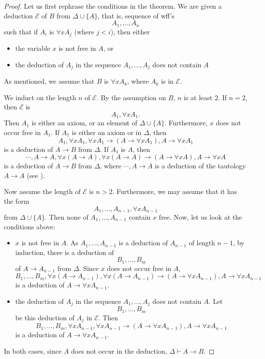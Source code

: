 \documentclass[12pt]{article}
\begin{document}
\begin{proof}  Let us first rephrase the conditions in the theorem.  We are given a deduction $\mathcal{E}$ of $B$ from $\Delta \cup \lbrace A\rbrace$, that is, sequence of wff's $$A_1,\ldots, A_n$$
such that if $A_i$ is $\forall x A_j$ (where $j<i$), then either
\begin{itemize}
\item the variable $x$ is not free in $A$, or
\item the deduction of $A_j$ in the sequence $A_1,\ldots, A_j$ does not contain $A$
\end{itemize}

As mentioned, we assume that $B$ is $\forall x A_k$, where $A_k$ is in $\mathcal{E}$.

We induct on the length $n$ of $\mathcal{E}$.  By the assumption on $B$, $n$ is at least $2$.  If $n=2$, then $\mathcal{E}$ is $$A_1, \forall x A_1.$$  Then $A_1$ is either an axiom, or an element of $\Delta \cup \lbrace A\rbrace$.  Furthermore, $x$ does not occur free in $A_1$.  If $A_1$ is either an axiom or in $\Delta$, then
\begin{equation} A_1, \forall x A_1, \forall x A_1 \to (A \to \forall x A_1), A \to \forall x A_1\end{equation}
is a deduction of $A \to B$ from $\Delta$.  If $A_1$ is $A$, then
\begin{equation}\cdots, A\to A , \forall x (A\to A), \forall x(A\to A) \to (A\to \forall x A), A\to \forall xA \end{equation}
is a deduction of $A\to B$ from $\Delta$, where $\cdots, A\to A$ is a deduction of the tautology $A\to A$ (see ).

Now assume the length of $\mathcal{E}$ is $n>2$.  Furthermore, we may assume that it has the form
$$A_1,\ldots, A_{n-1}, \forall x A_{n-1}$$
from $\Delta\cup \lbrace A \rbrace$.  Then none of $A_1,\ldots, A_{n-1}$ contain $x$ free.  Now, let us look at the conditions above:
\begin{itemize}
\item $x$ is not free in $A$.  As $A_1,\ldots, A_{n-1}$ is a deduction of $A_{n-1}$ of length $n-1$, by induction, there is a deduction of $$B_1,\ldots,B_m$$ of $A\to A_{n-1}$ from $\Delta$.  Since $x$ does not occur free in $A$, \begin{equation}B_1,\ldots,B_m, \forall x (A\to A_{n-1}), \forall x (A\to A_{n-1}) \to (A \to \forall x A_{n-1}), A\to \forall x A_{n-1} \end{equation} is a deduction of $A\to \forall x A_{n-1}$.
\item the deduction of $A_j$ in the sequence $A_1,\ldots, A_j$ does not contain $A$.  Let $$B_1,\ldots, B_m$$ be this deduction of $A_j$ in $\mathcal{E}$.  Then 
\begin{equation}B_1,\ldots, B_m, \forall x A_{n-1}, \forall x A_{n-1} \to (A \to \forall x A_{n-1}), A\to \forall x A_{n-1}\end{equation} is a deduction of $A\to \forall x A_{n-1}$.
\end{itemize}
In both cases, since $A$ does not occur in the deduction, $\Delta \vdash A \to B$.
\end{proof}
\end{document}
